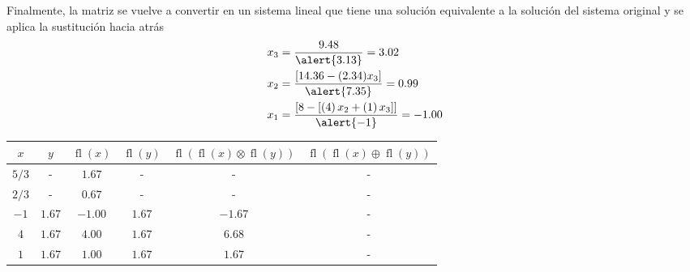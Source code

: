 \documentclass[
	spanish,
	8pt,
	utf8,
	xcolor=table,
	handout,
	aspectratio=169,
	professionalfonts,
	mathserif,
	leqno,
]{beamer}
\begin{document}
\begin{frame}
\begin{minipage}{0.35\textwidth}
		Finalmente, la matriz se vuelve a convertir en un sistema
		lineal que tiene una solución equivalente a la solución del
		sistema original y se aplica la sustitución hacia atrás
		\begin{align*}
			x_{3} &
			=\frac{9.48}{\alert{3.13}}=
			3.02    \\
			x_{2} &
			=\frac{\left[14.36-(2.34)x_{3}\right]}{\alert{7.35}}=
			0.99    \\
			x_{1} &
			=\frac{\left[8-\left[\left(4\right)x_{2}+\left(1\right)x_{3}\right]\right]}{\alert{-1}}=
			-1.00
		\end{align*}
	\end{minipage}
	\begin{minipage}{0.6\textwidth}
		\begin{table}[ht!]
			\centering
			\tiny
			\begin{tabular}{|cccccc|}
				\hline
				$x$                                                                                                   & $y$                               &
				$\operatorname{fl}\left(x\right)$                                                                     & $\operatorname{fl}\left(y\right)$ &
				$\operatorname{fl}\left(\operatorname{fl}\left(x\right)\otimes\operatorname{fl}\left(y\right)\right)$ &
				$\operatorname{fl}\left(\operatorname{fl}\left(x\right)\oplus\operatorname{fl}\left(y\right)\right)$                                                                                \\
				\hline
				$5/3$                                                                                                 & -                                 & $1.67$  & -        & -        & -       \\
				$2/3$                                                                                                 & -                                 & $0.67$  & -        & -        & -       \\
				$-1$                                                                                                  & $1.67$                            & $-1.00$ & $1.67$   & $-1.67$  & -       \\
				$4$                                                                                                   & $1.67$                            & $4.00$  & $1.67$   & $6.68$   & -       \\
				$1$                                                                                                   & $1.67$                            & $1.00$  & $1.67$   & $1.67$   & -       \\

\end{tabular}
\end{table}
\end{minipage}
\end{frame}
\end{document}
